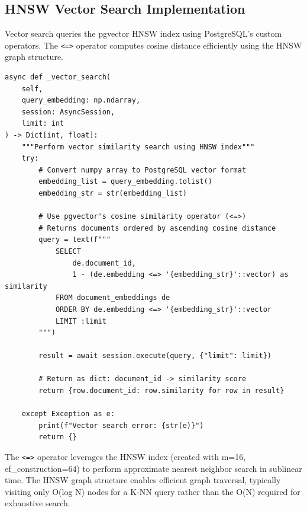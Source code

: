 \subsection{HNSW Vector Search Implementation}

Vector search queries the pgvector HNSW index using PostgreSQL's custom operators. The \texttt{<=>} operator computes cosine distance efficiently using the HNSW graph structure.

\begin{lstlisting}
async def _vector_search(
    self,
    query_embedding: np.ndarray,
    session: AsyncSession,
    limit: int
) -> Dict[int, float]:
    """Perform vector similarity search using HNSW index"""
    try:
        # Convert numpy array to PostgreSQL vector format
        embedding_list = query_embedding.tolist()
        embedding_str = str(embedding_list)
        
        # Use pgvector's cosine similarity operator (<=>)
        # Returns documents ordered by ascending cosine distance
        query = text(f"""
            SELECT 
                de.document_id,
                1 - (de.embedding <=> '{embedding_str}'::vector) as similarity
            FROM document_embeddings de
            ORDER BY de.embedding <=> '{embedding_str}'::vector
            LIMIT :limit
        """)
        
        result = await session.execute(query, {"limit": limit})
        
        # Return as dict: document_id -> similarity score
        return {row.document_id: row.similarity for row in result}
        
    except Exception as e:
        print(f"Vector search error: {str(e)}")
        return {}
\end{lstlisting}

The \texttt{<=>} operator leverages the HNSW index (created with m=16, ef\_construction=64) to perform approximate nearest neighbor search in sublinear time. The HNSW graph structure enables efficient graph traversal, typically visiting only O(log N) nodes for a K-NN query rather than the O(N) required for exhaustive search.

